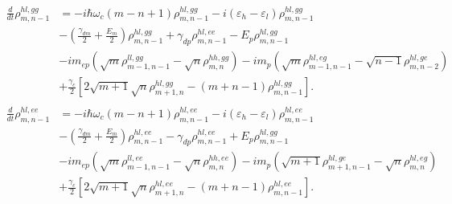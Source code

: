 \documentclass[aps,prb,
superscriptaddress,
,floatfix,footinbib,longbibliography,
preprint
]{revtex4-2}
\begin{document}
%
%
\begin{equation}
\begin{split}
\frac{d}{dt}\rho_{m,n-1}^{hl,gg}&=-i\hbar\omega_{c}(m-n+1)\rho_{m,n-1}^{hl,gg}
-i(\varepsilon_{h}-\varepsilon_{l})\rho_{m,n-1}^{hl,gg}\\
&-(\frac{\gamma_{dm}}{2}+\frac{E_{m}}{2})\rho_{m,n-1}^{hl,gg}
+\gamma_{dp}\rho_{m,n-1}^{hl,ee}-E_{p}\rho_{m,n-1}^{hl,gg}\\
&-im_{ep}(\sqrt{m}\rho_{m-1,n-1}^{ll,gg}-\sqrt{n}\rho_{m,n}^{hh,gg})
-im_{p}(\sqrt{m}\rho_{m-1,n-1}^{hl,eg}-\sqrt{n-1}\rho_{m,n-2}^{hl,ge})\\
&+\frac{\gamma_{c}}{2}[2\sqrt{m+1}\sqrt{n}\rho_{m+1,n}^{hl,gg}-(m+n-1)\rho_{m,n-1}^{hl,gg}].\\
\end{split}
\label{hl,gg}
\end{equation}
%
\begin{equation}
\begin{split}
\frac{d}{dt}\rho_{m,n-1}^{hl,ee}&=-i\hbar\omega_{c}(m-n+1)\rho_{m,n-1}^{hl,ee}
-i(\varepsilon_{h}-\varepsilon_{l})\rho_{m,n-1}^{hl,ee}\\
&-(\frac{\gamma_{dm}}{2}+\frac{E_{m}}{2})\rho_{m,n-1}^{hl,ee}
-\gamma_{dp}\rho_{m,n-1}^{hl,ee}+E_{p}\rho_{m,n-1}^{hl,gg}\\
&-im_{ep}(\sqrt{m}\rho_{m-1,n-1}^{ll,ee}-\sqrt{n}\rho_{m,n}^{hh,ee})
-im_{p}(\sqrt{m+1}\rho_{m+1,n-1}^{hl,ge}-\sqrt{n}\rho_{m,n}^{hl,eg})\\
&+\frac{\gamma_{c}}{2}[2\sqrt{m+1}\sqrt{n}\rho_{m+1,n}^{hl,ee}-(m+n-1)\rho_{m,n-1}^{hl,ee}].\\
\end{split}
\label{hl,ee}
\end{equation}
\end{document}
